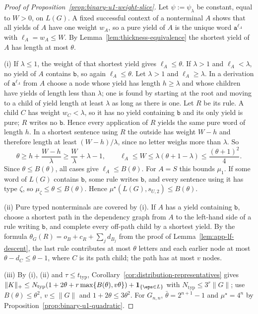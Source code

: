 \begin{proof}[Proof of Proposition~\ref{prop:binary-u1-weight-slice}]
Let $\psi:=\psi_\lambda$ be constant, equal to $W>0$, on $L(G)$.  A fixed
successful context of a nonterminal $A$ shows that all yields of $A$ have one
weight $w_A$, so a pure yield of $A$ is the unique word $\mathtt a^{\ell_A}$ with
$\ell_A=w_A\le W$.  By Lemma~\ref{lem:thickness-equivalence} the shortest yield
of $A$ has length at most $\theta$.

(i) If $\lambda\le1$, the weight of that shortest yield gives $\ell_A\le\theta$.
If $\lambda>1$ and $\ell_A<\lambda$, no yield of $A$ contains $\mathtt b$, so again
$\ell_A\le\theta$.  Let $\lambda>1$ and $\ell_A\ge\lambda$.  In a derivation of
$\mathtt a^{\ell_A}$ from $A$ choose a node whose yield has length $h\ge\lambda$ and
whose children have yields of length less than $\lambda$; one is found by
starting at the root and moving to a child of yield length at least $\lambda$ as
long as there is one.  Let $R$ be its rule.  A child $C$ has weight $w_C<\lambda$, so it has no yield containing
$\mathtt b$ and its only yield is pure; $R$ writes no $\mathtt b$.  Hence every
application of $R$ yields the same pure word of length $h$.  In a shortest
sentence using $R$ the outside has weight $W-h$ and therefore length at least
$(W-h)/\lambda$, since no letter weighs more than $\lambda$.  So
\[
 \theta\ge h+\frac{W-h}{\lambda}\ge\frac W\lambda+\lambda-1,
 \qquad
 \ell_A\le W\le\lambda(\theta+1-\lambda)\le\frac{(\theta+1)^2}{4}.
\]
Since $\theta\le B(\theta)$, all cases give $\ell_A\le B(\theta)$.  For $A=S$
this bounds $\mu_1$.  If some word of $L(G)$ contains $\mathtt b$, some rule writes
$\mathtt b$, and every sentence using it has type $\zeta$, so
$\mu_\zeta\le\theta\le B(\theta)$.  Hence $\mu^\star(L(G),s_{U,2})\le B(\theta)$.

(ii) Pure typed nonterminals are covered by (i).  If $A$ has a yield containing
$\mathtt b$, choose a shortest path in the dependency graph from $A$ to the
left-hand side of a rule writing $\mathtt b$, and complete every off-path child by
a shortest yield.  By the formula
$\theta_G(R)=o_B+c_R+\sum_jd_{B_j}$ from the proof of
Lemma~\ref{lem:app-lf-descent}, the last rule contributes at most $\theta$
letters and each earlier node at most $\theta-d_C\le\theta-1$, where $C$ is its
path child; the path has at most $v$ nodes.

(iii) By (i), (ii) and $\tau\le t_{\mathrm{typ}}$,
Corollary~\ref{cor:distribution-representatives} gives
$\|K\|_+\le N_{\mathrm{typ}}(1+2\theta+r\max\{B(\theta),v\theta\})+\mathbf 1_{\{\eps\in L\}}$
with $N_{\mathrm{typ}}\le3^r\|G\|$; use $B(\theta)\le\theta^2$, $v\le\|G\|$ and
$1+2\theta\le3\theta^2$.  For $G_{n,n}$, $\bar\theta=2^{n+1}-1$ and $\mu^\star=4^n$ by
Proposition~\ref{prop:binary-u1-quadratic}.
\end{proof}

